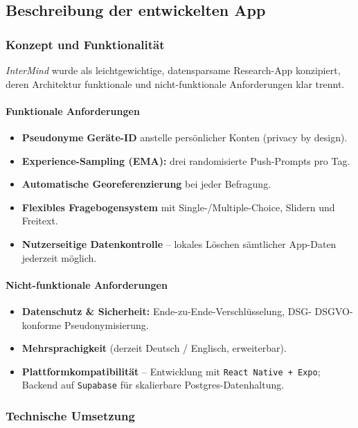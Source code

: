 \subsection{Beschreibung der entwickelten App}

\subsubsection{Konzept und Funktionalität}

\textit{InterMind} wurde als leichtgewichtige, datensparsame Research-App konzipiert, deren Architektur funktionale und nicht-funktionale Anforderungen klar trennt.

\paragraph{Funktionale Anforderungen}

\begin{itemize}
  \item \textbf{Pseudonyme Geräte-ID} anstelle persönlicher Konten (privacy by design).
  \item \textbf{Experience-Sampling (EMA):} drei randomisierte Push-Prompts pro Tag.
  \item \textbf{Automatische Georeferenzierung} bei jeder Befragung.
  \item \textbf{Flexibles Fragebogensystem} mit Single-/Multiple-Choice, Slidern und Freitext.
  \item \textbf{Nutzerseitige Datenkontrolle} – lokales Löschen sämtlicher App-Daten jederzeit möglich.
\end{itemize}

\paragraph{Nicht-funktionale Anforderungen}

\begin{itemize}
  \item \textbf{Datenschutz \& Sicherheit:} Ende-zu-Ende-Verschlüsselung, DSG- DSGVO-konforme Pseudonymisierung.
  \item \textbf{Mehrsprachigkeit} (derzeit Deutsch / Englisch, erweiterbar).
  \item \textbf{Plattformkompatibilität} – Entwicklung mit \texttt{React Native + Expo}; Backend auf \texttt{Supabase} für skalierbare Postgres-Datenhaltung.
\end{itemize}

\subsubsection{Technische Umsetzung}

